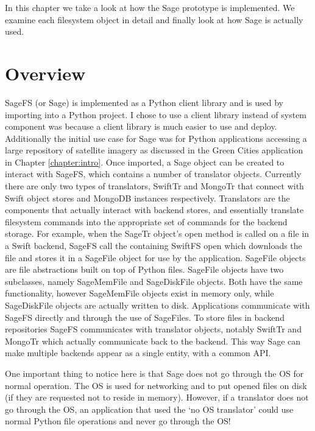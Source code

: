 \label{chapter:imp}

In this chapter we take a look at how the Sage prototype is implemented. We
examine each  filesystem object in detail and finally look at how Sage is
actually used.

\section{Overview}


SageFS (or Sage) is implemented as a Python client library and is used by
importing into a  Python project. I chose to use a client library instead of
system component was because a  client library is much easier to use and
deploy. Additionally the initial use case for  Sage was for Python
applications accessing a large repository of satellite imagery as discussed in
the Green  Cities application in Chapter \ref{chapter:intro}.  Once imported,
a Sage object can be created to interact with SageFS, which contains a number
of translator objects. Currently there are only two types of translators,
SwiftTr and MongoTr  that connect with Swift object stores and MongoDB
instances respectively. Translators are the components that actually interact
with backend stores, and essentially translate filesystem  commands into the
appropriate set of commands for the backend storage. For example, when the
SageTr object's open method is called on a file in a Swift backend, SageFS
call the containing  SwiftFS open which downloads the file and stores it in a
SageFile object for use by the application.  SageFile objects are file
abstractions built on top of Python files. SageFile objects have two
subclasses, namely SageMemFile and SageDiskFile objects. Both have the same
functionality, however  SageMemFile objects exist in memory only, while
SageDiskFile objects are actually written to disk.  Applications communicate
with SageFS directly and through the use of SageFiles. To store files in
backend repositories SageFS communicates with translator objects, notably
SwiftTr and MongoTr  which actually communicate back to the backend. This way
Sage can make multiple backends appear  as a single entity, with a common API.

One important thing to notice here is that Sage does not go through the OS for
normal operation.  The OS is used for networking and to put opened files on
disk (if they are requested not to  reside in memory). However, if a
translator does not go through the OS, an application that  used the `no OS
translator' could use normal Python file operations and never go through the
OS!

